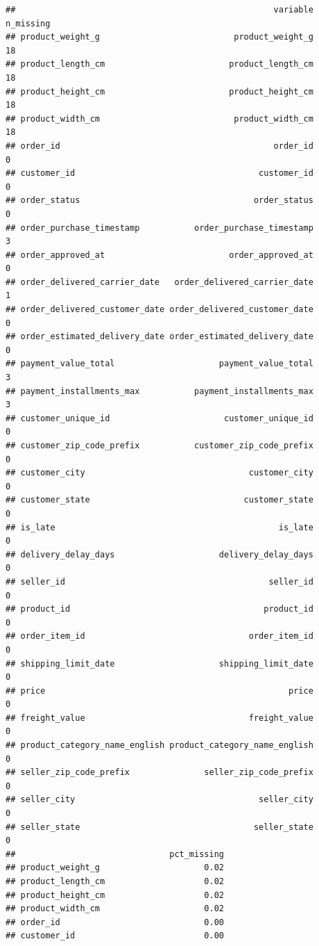 \documentclass[
]{article}
\begin{document}
\begin{verbatim}
##                                                    variable n_missing
## product_weight_g                           product_weight_g        18
## product_length_cm                         product_length_cm        18
## product_height_cm                         product_height_cm        18
## product_width_cm                           product_width_cm        18
## order_id                                           order_id         0
## customer_id                                     customer_id         0
## order_status                                   order_status         0
## order_purchase_timestamp           order_purchase_timestamp         3
## order_approved_at                         order_approved_at         0
## order_delivered_carrier_date   order_delivered_carrier_date         1
## order_delivered_customer_date order_delivered_customer_date         0
## order_estimated_delivery_date order_estimated_delivery_date         0
## payment_value_total                     payment_value_total         3
## payment_installments_max           payment_installments_max         3
## customer_unique_id                       customer_unique_id         0
## customer_zip_code_prefix           customer_zip_code_prefix         0
## customer_city                                 customer_city         0
## customer_state                               customer_state         0
## is_late                                             is_late         0
## delivery_delay_days                     delivery_delay_days         0
## seller_id                                         seller_id         0
## product_id                                       product_id         0
## order_item_id                                 order_item_id         0
## shipping_limit_date                     shipping_limit_date         0
## price                                                 price         0
## freight_value                                 freight_value         0
## product_category_name_english product_category_name_english         0
## seller_zip_code_prefix               seller_zip_code_prefix         0
## seller_city                                     seller_city         0
## seller_state                                   seller_state         0
##                               pct_missing
## product_weight_g                     0.02
## product_length_cm                    0.02
## product_height_cm                    0.02
## product_width_cm                     0.02
## order_id                             0.00
## customer_id                          0.00

\end{verbatim}
\end{document}
